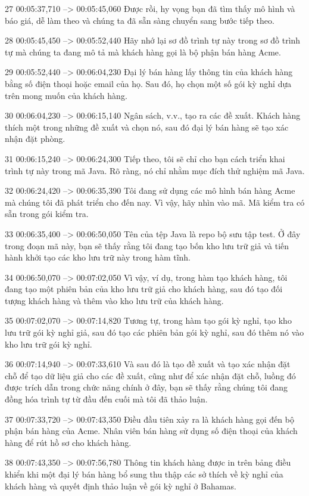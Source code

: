 27
00:05:37,710 --> 00:05:45,060
Được rồi, hy vọng bạn đã tìm thấy mô hình và báo giá, dễ làm theo và chúng ta đã sẵn sàng chuyển sang bước tiếp theo.

28
00:05:45,450 --> 00:05:52,440
Hãy nhớ lại sơ đồ trình tự này trong sơ đồ trình tự mà chúng ta đang mô tả mà khách hàng gọi là bộ phận bán hàng Acme.

29
00:05:52,440 --> 00:06:04,230
Đại lý bán hàng lấy thông tin của khách hàng bằng số điện thoại hoặc email của họ.  Sau đó, họ chọn một số gói kỳ nghỉ dựa trên mong muốn của khách hàng.

30
00:06:04,230 --> 00:06:15,140
Ngân sách, v.v., tạo ra các đề xuất.  Khách hàng thích một trong những đề xuất và chọn nó, sau đó đại lý bán hàng sẽ tạo xác nhận đặt phòng.

31
00:06:15,240 --> 00:06:24,300
Tiếp theo, tôi sẽ chỉ cho bạn cách triển khai trình tự này trong mã Java.  Rõ ràng, nó chỉ nhằm mục đích thử nghiệm mã Java.

32
00:06:24,420 --> 00:06:35,390
Tôi đang sử dụng các mô hình bán hàng Acme mà chúng tôi đã phát triển cho đến nay.  Vì vậy, hãy nhìn vào mã.  Mã kiểm tra có sẵn trong gói kiểm tra.

33
00:06:35,400 --> 00:06:50,050
Tên của tệp Java là repo bộ sưu tập test.  Ở đây trong đoạn mã này, bạn sẽ thấy rằng tôi đang tạo bốn kho lưu trữ giả và tiến hành khởi tạo các kho lưu trữ này trong hàm tĩnh.

34
00:06:50,070 --> 00:07:02,050
Vì vậy, ví dụ, trong hàm tạo khách hàng, tôi đang tạo một phiên bản của kho lưu trữ giả cho khách hàng, sau đó tạo đối tượng khách hàng và thêm vào kho lưu trữ của khách hàng.

35
00:07:02,070 --> 00:07:14,820
Tương tự, trong hàm tạo gói kỳ nghỉ, tạo kho lưu trữ gói kỳ nghỉ giả, sau đó tạo các phiên bản gói kỳ nghỉ, sau đó thêm nó vào kho lưu trữ gói kỳ nghỉ.

36
00:07:14,940 --> 00:07:33,610
Và sau đó là tạo đề xuất và tạo xác nhận đặt chỗ để tạo dữ liệu giả cho các đề xuất, cũng như để xác nhận đặt chỗ, luồng đó được trích dẫn trong chức năng chính ở đây, bạn sẽ thấy rằng chúng tôi đang đồng hóa trình tự từ đầu đến cuối mà tôi đã thảo luận.

37
00:07:33,720 --> 00:07:43,350
Điều đầu tiên xảy ra là khách hàng gọi đến bộ phận bán hàng của Acme.  Nhân viên bán hàng sử dụng số điện thoại của khách hàng để rút hồ sơ cho khách hàng.

38
00:07:43,350 --> 00:07:56,780
Thông tin khách hàng được in trên bảng điều khiển khi một đại lý bán hàng bổ sung thu thập các sở thích về kỳ nghỉ của khách hàng và quyết định thảo luận về gói kỳ nghỉ ở Bahamas.

